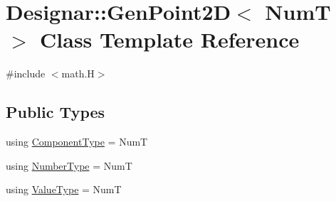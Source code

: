 \hypertarget{class_designar_1_1_gen_point2_d}{}\section{Designar\+:\+:Gen\+Point2D$<$ NumT $>$ Class Template Reference}
\label{class_designar_1_1_gen_point2_d}


{\ttfamily \#include $<$math.\+H$>$}

\subsection*{Public Types}
\begin{DoxyCompactItemize}
\item 
using \hyperlink{class_designar_1_1_gen_point2_d_a8d80993f38dab83a39e80a50db08b944}{Component\+Type} = NumT
\item 
using \hyperlink{class_designar_1_1_gen_point2_d_a6ad786447c17adc8cbaece7f12ac2132}{Number\+Type} = NumT
\item 
using \hyperlink{class_designar_1_1_gen_point2_d_a8f13f44ca3438223d1ecdce2728b9437}{Value\+Type} = NumT
\end{DoxyCompactItemize}
